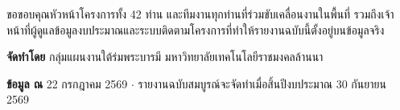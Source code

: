 \documentclass[12pt,a4paper]{article}
\begin{document}
ขอขอบคุณหัวหน้าโครงการทั้ง 42 ท่าน และทีมงานทุกท่านที่ร่วมขับเคลื่อนงานในพื้นที่
รวมถึงเจ้าหน้าที่ผู้ดูแลข้อมูลงบประมาณและระบบติดตามโครงการที่ทำให้รายงานฉบับนี้ตั้งอยู่บนข้อมูลจริง

\vspace{14pt}
{\footnotesize\color{rpfink}\textbf{จัดทำโดย} กลุ่มแผนงานใต้ร่มพระบารมี มหาวิทยาลัยเทคโนโลยีราชมงคลล้านนา\par
\textbf{ข้อมูล ณ} 22 กรกฎาคม 2569 $\cdot$ รายงานฉบับสมบูรณ์จะจัดทำเมื่อสิ้นปีงบประมาณ 30 กันยายน 2569}
\end{document}
